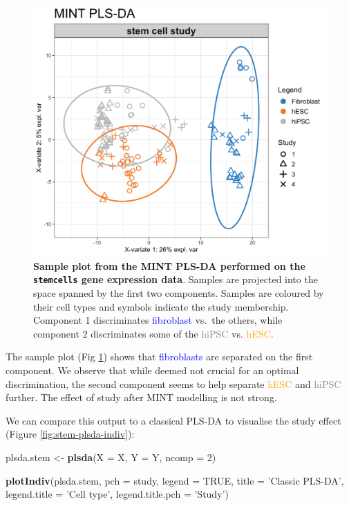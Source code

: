 \documentclass[]{book}
\newenvironment{Shaded}{\begin{snugshade}}{\end{snugshade}}
\newcommand{\KeywordTok}[1]{\textcolor[rgb]{0.13,0.29,0.53}{\textbf{#1}}}
\newcommand{\DataTypeTok}[1]{\textcolor[rgb]{0.13,0.29,0.53}{#1}}
\newcommand{\DecValTok}[1]{\textcolor[rgb]{0.00,0.00,0.81}{#1}}
\newcommand{\StringTok}[1]{\textcolor[rgb]{0.31,0.60,0.02}{#1}}
\newcommand{\OtherTok}[1]{\textcolor[rgb]{0.56,0.35,0.01}{#1}}
\newcommand{\NormalTok}[1]{#1}
\begin{document}
\begin{figure}

{\centering \includegraphics[width=0.5\linewidth]{Figures/MINT/MINT-plsda-indiv-1} 

}

\caption{\textbf{Sample plot from the MINT PLS-DA
performed on the \texttt{stemcells} gene expression data}. Samples are
projected into the space spanned by the first two components. Samples
are coloured by their cell types and symbols indicate the study
membership. Component 1 discriminates \textcolor{blue}{fibroblast}
vs.~the others, while component 2 discriminates some of the
\textcolor{grey}{hiPSC} vs. \textcolor{orange}{hESC}.}\label{fig:MINT-plsda-indiv}
\end{figure}









The sample plot (Fig \ref{fig:MINT-plsda-indiv}) shows that
\textcolor{blue}{fibroblasts} are separated on the first component. We
observe that while deemed not crucial for an optimal discrimination, the
second component seems to help separate \textcolor{orange}{hESC} and
\textcolor{grey}{hiPSC} further. The effect of study after MINT
modelling is not strong.

We can compare this output to a classical PLS-DA to visualise the study
effect (Figure \ref{fig:stem-plsda-indiv}):

\begin{Shaded}
\begin{Highlighting}[]
\NormalTok{plsda.stem <-}\StringTok{ }\KeywordTok{plsda}\NormalTok{(}\DataTypeTok{X =}\NormalTok{ X, }\DataTypeTok{Y =}\NormalTok{ Y, }\DataTypeTok{ncomp =} \DecValTok{2}\NormalTok{)}

\KeywordTok{plotIndiv}\NormalTok{(plsda.stem, }\DataTypeTok{pch =}\NormalTok{ study,}
          \DataTypeTok{legend =} \OtherTok{TRUE}\NormalTok{, }\DataTypeTok{title =} \StringTok{'Classic PLS-DA'}\NormalTok{,}
          \DataTypeTok{legend.title =} \StringTok{'Cell type'}\NormalTok{, }\DataTypeTok{legend.title.pch =} \StringTok{'Study'}\NormalTok{)}
\end{Highlighting}
\end{Shaded}
\end{document}
